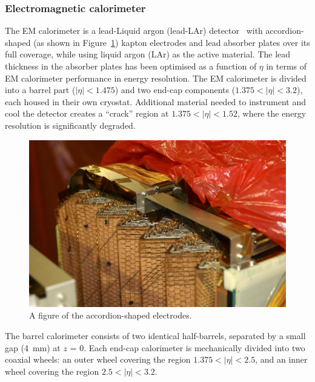 	\subsubsection{Electromagnetic calorimeter} 
	The EM calorimeter is a lead-Liquid argon (lead-LAr) detector~\cite{ATLAS-TDR-02} 
	with accordion-shaped (as shown in Figure~\ref{fig:accordion}) kapton electrodes and lead 
	absorber plates over its full coverage, while using liquid argon (LAr) as the active 
	material. 
	The lead thickness in the absorber plates has been optimised as a function of $\eta$ 
	in terms of EM calorimeter performance in energy resolution. 
	The EM calorimeter is divided into a barrel part ($|\eta| < 1.475$) 
	and two end-cap components ($1.375 < |\eta|< 3.2$), each housed 
	in their own cryostat. Additional material needed to instrument
	and cool the detector creates a ``crack'' region at $1.375 < |\eta|< 1.52$, where the 
	energy resolution is significantly degraded.
	
	\begin{figure}[bht]
		\begin{centering}	
		\includegraphics[width=.6\textwidth]{Detector_plots/accordion.jpg}
		\caption{A figure of the accordion-shaped electrodes.}
		\label{fig:accordion}
		\end{centering}
	\end{figure}
	The barrel calorimeter 	consists of two identical half-barrels, 
	separated by a small gap (4~mm) at $z$ = 0. 
	Each end-cap calorimeter is mechanically divided into two coaxial wheels: 
	an outer wheel covering the region $1.375 < |\eta|< 2.5$, and an inner wheel 
	covering the region $2.5 < |\eta|< 3.2$.
	
